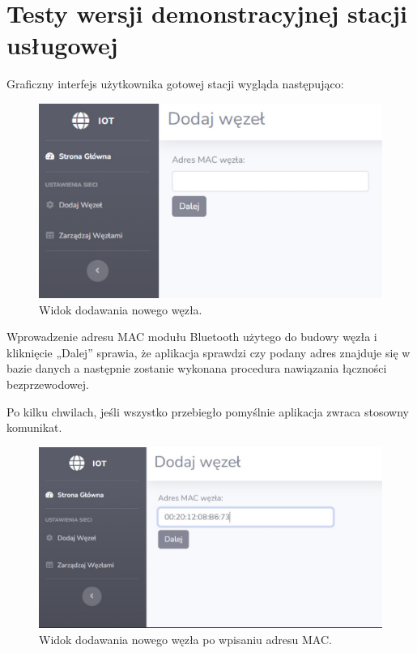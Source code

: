 \documentclass[12pt, twoside, openany]{mwrep}
\begin{document}
\section{Testy wersji demonstracyjnej stacji usługowej}
Graficzny interfejs użytkownika gotowej stacji wygląda następująco:
\begin{figure}[H]
\centering
\includegraphics[width=\textwidth]{test1}
\caption{Widok dodawania nowego węzła.}
\end{figure}
\par
Wprowadzenie adresu MAC modułu Bluetooth użytego do budowy węzła i kliknięcie „Dalej” sprawia, że aplikacja sprawdzi czy podany adres znajduje się w bazie danych a następnie zostanie wykonana procedura nawiązania łączności bezprzewodowej.  
\par
Po kilku chwilach, jeśli wszystko przebiegło pomyślnie aplikacja zwraca stosowny komunikat.
\begin{figure}[H]
\centering
\includegraphics[width=\textwidth]{test2}
\caption{Widok dodawania nowego węzła po wpisaniu adresu MAC.}
\end{figure}
\end{document}
